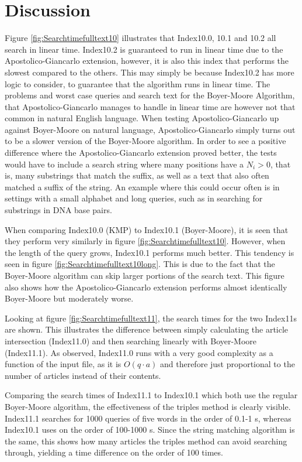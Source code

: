 \newpage\clearpage
\section{Discussion}
Figure \ref{fig:Searchtimefulltext10} illustrates that Index10.0, 10.1 and 10.2 all search in linear time. Index10.2 is guaranteed to run in linear time due to the Apostolico-Giancarlo extension, however, it is also this index that performs the slowest compared to the others. This may simply be because Index10.2 has more logic to consider, to guarantee that the algorithm runs in linear time. The problems and worst case queries and search text for the Boyer-Moore Algorithm, that Apostolico-Giancarlo manages to handle in linear time are however not that common in  natural English language. When testing Apostolico-Giancarlo up against Boyer-Moore on natural language, Apostolico-Giancarlo simply turns out to be a slower version of the Boyer-Moore algorithm. In order to see a positive difference where the Apostolico-Giancarlo extension proved better, the tests would have to include a search string where many positions have a $N_i>0$, that is, many substrings that match the suffix, as well as a text that also often matched a suffix of the string. An example where this could occur often is in settings with a small alphabet and long queries, such as in searching for substrings in DNA base pairs. 

When comparing Index10.0 (KMP) to Index10.1 (Boyer-Moore), it is seen that they perform very similarly in figure \ref{fig:Searchtimefulltext10}. However, when the length of the query grows, Index10.1 performs much better. This tendency is seen in figure \ref{fig:Searchtimefulltext10long}. This is due to the fact that the Boyer-Moore algorithm can skip larger portions of the search text. This figure also shows how the Apostolico-Giancarlo extension performs almost identically Boyer-Moore but moderately worse. 

Looking at figure \ref{fig:Searchtimefulltext11}, the search times for the two Index11s are shown. This illustrates the difference between simply calculating the article intersection (Index11.0) and then searching linearly with Boyer-Moore (Index11.1). As observed, Index11.0 runs with a very good complexity as a function of the input file, as it is $O(q\cdot a)$ and therefore just proportional to the number of articles instead of their contents. 

Comparing the search times of Index11.1 to Index10.1 which both use the regular Boyer-Moore algorithm, the effectiveness of the triples method is clearly visible. Index11.1 searches for 1000 queries of five words in the order of 0.1-1 s, whereas Index10.1 uses on the order of 100-1000 s. Since the string matching algorithm is the same, this shows how many articles the triples method can avoid searching through, yielding a time difference on the order of 100 times. 

